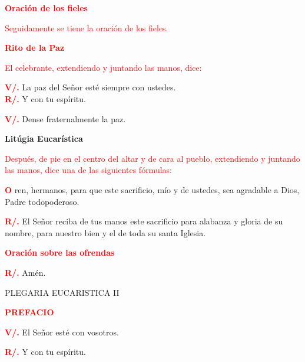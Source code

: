\documentclass[12pt, letterpaper]{report}
\begin{document}
\Large {\bfseries \textcolor{red}{Oraci\'on de los fieles}} 

\large {\textcolor{red}{Seguidamente se tiene la oraci\'on de los fieles.}} 

\Large {\bfseries \textcolor{red}{Rito de la Paz}}

\large {\textcolor{red}{El celebrante, extendiendo y juntando las manos, dice:}}

\noindent
\Large {\bfseries \textcolor{red}{V/.}} \hspace{0.5cm} La paz del Se\~nor est\'e siempre con ustedes.\\
\noindent
\Large {\bfseries \textcolor{red}{R/.}} \hspace{0.5cm} Y con tu esp\'iritu. 

\noindent
\Large {\bfseries \textcolor{red}{V/.}} \hspace{0.5cm} Dense fraternalmente la paz. 

\begin{center}
\Huge {\bfseries Lit\'ugia Eucar\'istica}
\end{center}

\large {\textcolor{red}{Despu\'es, de pie en el centro del altar y de cara al pueblo, extendiendo y juntando las manos, dice una de las siguientes f\'ormulas:}}

\lettrine[lines=2]{\bfseries \textcolor{red}{O}}{} \Large ren, hermanos, para que este sacrificio, m\'io y de ustedes, sea agradable a Dios, Padre todopoderoso. 

\noindent
\Large {\bfseries \textcolor{red}{R/.}} \hspace{0.5cm} El Se\~nor reciba de tus manos este sacrificio para alabanza y gloria de su nombre, para nuestro bien y el de toda su santa Iglesia.

\Large {\bfseries \textcolor{red}{Oraci\'on sobre las ofrendas}}

\noindent
\Large {\bfseries \textcolor{red}{R/.}} \hspace{0.5cm} Am\'en.

\begin{center}
\Large PLEGARIA EUCARISTICA II
\end{center}

\Large {\bfseries \textcolor{red}{PREFACIO}}

\noindent
\Large {\bfseries \textcolor{red}{V/.}} \hspace{0.5cm} El Se\~nor est\'e con vosotros.

\noindent
\Large {\bfseries \textcolor{red}{R/.}} \hspace{0.5cm} Y con tu esp\'iritu. 
\end{document}
